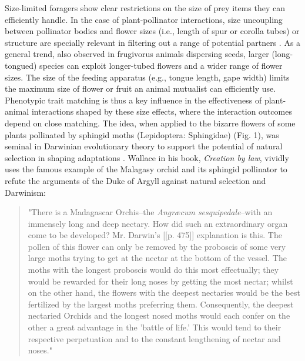 \documentclass[a4paper,12pt]{article}
\begin{document}
Size-limited foragers show clear restrictions on the size of prey items they can efficiently handle. In the case of plant-pollinator interactions, size uncoupling between pollinator bodies and flower sizes (i.e., length of spur or corolla tubes) or structure are specially relevant in filtering out a range of potential partners \citep{Cocucci:2009}. As a general trend, also observed in frugivorus animals dispersing seeds, larger (long-tongued) species can exploit longer-tubed flowers and a wider range of flower sizes. The size of the feeding apparatus (e.g., tongue length, gape width) limits the maximum size of flower or fruit an animal mutualist can efficiently use. Phenotypic trait matching is thus a key influence in the effectiveness of plant-animal interactions shaped by these size effects, where the interaction outcomes depend on close matching. The idea, when applied to the bizarre flowers of some plants pollinated by sphingid moths (Lepidoptera: Sphingidae) (Fig. 1), was seminal in Darwinian evolutionary theory to support the potential of natural selection in shaping adaptations \citep{Arditti:2012}. Wallace \citep{Wallace:1867} in his book, \textit{Creation by law}, vividly uses the famous example of the Malagasy orchid and its sphingid pollinator to refute the arguments of the Duke of Argyll against natural selection and Darwinism:

\begin{spacing}{1.0}
	\begin{quotation}
	 "There is a Madagascar Orchis--the \textit{Angræcum sesquipedale}--with an immensely long and deep nectary. How did such an extraordinary organ come to be developed? Mr. Darwin's [[p. 475]] explanation is this. The pollen of this flower can only be removed by the proboscis of some very large moths trying to get at the nectar at the bottom of the vessel. The moths with the longest proboscis would do this most effectually; they would be rewarded for their long noses by getting the most nectar; whilst on the other hand, the flowers with the deepest nectaries would be the best fertilized by the largest moths preferring them. Consequently, the deepest nectaried Orchids and the longest nosed moths would each confer on the other a great advantage in the 'battle of life.' This would tend to their respective perpetuation and to the constant lengthening of nectar and noses."
	 \end{quotation}
 \end{spacing}
 
\end{document}
